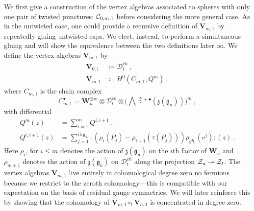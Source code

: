 \documentclass[a4paper]{article}
\def\CC{{\cal C}}
\def\ZZ{{\cal Z}}
\def\gf{\mathfrak{g}}
\def \zf{\mathfrak{z}}
\newcommand{\Li}[1]{\mathrm{\bigwedge}\,^{\frac{\infty}{2}+#1}}
\def\D{\mathcal{D}^{ch}}
\def\W{\mathbf{W}}
\def\V{\mathbf{V}}
\begin{document}
We first give a construction of the vertex algebras associated to spheres with only one pair of twisted punctures: $\CC_{0,m,1}$ before considering the more general case. As in the untwisted case, one could provide a recursive definition of $\V_{m,1}$ by repeatedly gluing untwisted caps. We elect, instead, to perform a simultaneous gluing and will show the equivalence between the two definitions later on. We define the vertex algebras $\V_{m,1}$ by
\begin{equation}
	\begin{split}
	\V_{0,1} &\coloneqq \D_t~,\\
	\V_{m,1} &\coloneqq H^0(C_{m,1},Q^m)~,
	\end{split}
\end{equation}
where $C_{m,1}$ is the chain complex
\begin{equation}
	C^{\bullet}_{m,1} = \W_u^{\otimes m} \otimes \D_t \otimes\bigg( \Li{\bullet}(\zf(\gf_u))\bigg)^{m} ~,
\end{equation}
with differential
\begin{equation}
	\begin{split}
	Q^{m}(z) &= \sum_{i=1}^{m}Q^{i,i+1}~,\\
	Q^{i,i+1}(z) &= \sum_{j=1}^{\mathrm{rk}\,\gf_u} : (\rho_i(P_j) -\rho_{i+1}(\tau(P_j)))\rho_{gh_{i}}(c^j):(z)~.
	\end{split}
\end{equation}
Here $\rho_i$, for $i\leqslant m$ denotes the action of $\zf(\gf_u)$ on the $i$th factor of $\W_u$ and $\rho_{m+1}$ denotes the action of $\zf(\gf_u)$ on $\D_t$ along the projection $\ZZ_u\twoheadrightarrow \ZZ_t$. %
The vertex algebras $\V_{m,1}$ live entirely in cohomological degree zero no fermions because we restrict to the zeroth cohomology---this is compatible with our expectation on the basis of residual gauge symmetries. We will later reinforce this by showing that the cohomology of $\V_{m,1}\circ_t\V_{n,1}$ is concentrated in degree zero.
\end{document}
